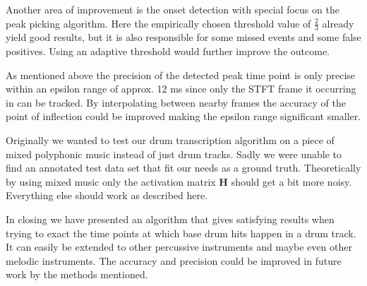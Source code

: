 \documentclass{article}
\begin{document}
Another area of improvement is the onset detection with special focus on the peak picking algorithm.
Here the empirically chosen threshold value of $\frac{2}{3}$ already yield good results, but it is also responsible for some missed events and some false positives.
Using an adaptive threshold would further improve the outcome.

As mentioned above the precision of the detected peak time point is only precise within an epsilon range of approx. 12 ms since only the STFT frame it occurring in can be tracked.
By interpolating between nearby frames the accuracy of the point of inflection could be improved making the epsilon range significant smaller.

Originally we wanted to test our drum transcription algorithm on a piece of mixed polyphonic music instead of just drum tracks.
Sadly we were unable to find an annotated test data set that fit our needs as a ground truth.
Theoretically by using mixed music only the activation matrix $\mathbf{H}$ should get a bit more noisy.
Everything else should work as described here.

In closing we have presented an algorithm that gives satisfying results when trying to exact the time points at which base drum hits happen in a drum track.
It can easily be extended to other percussive instruments and maybe even other melodic instruments.
The accuracy and precision could be improved in future work by the methods mentioned.





\end{document}
